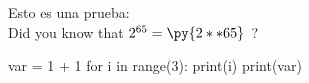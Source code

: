 \documentclass[12pt,a4paper]{article}
\begin{document}
Esto es una prueba: \\
Did you know that $2^{65} = \py{2**65}$\ ? 
\begin{pyconsole}
var = 1 + 1
for i in range(3):
	print(i)
print(var)
\end{pyconsole}

\begin{pycode}

\end{pycode}
\end{document}

